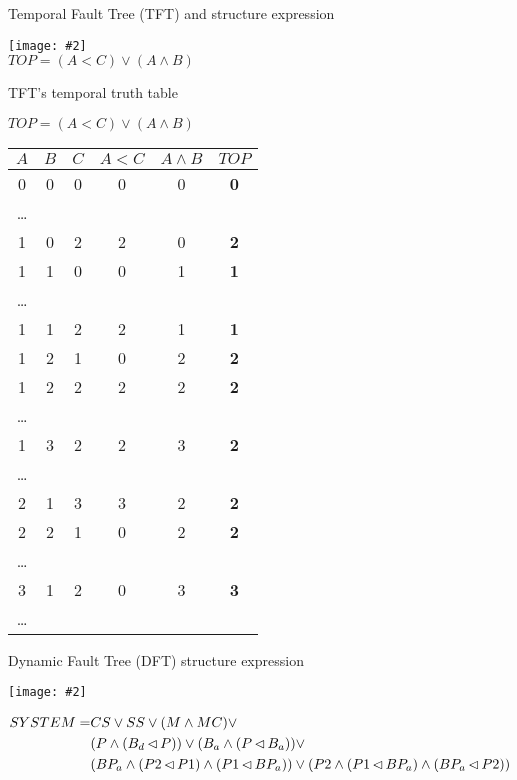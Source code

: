 \documentclass{beamer}
\def\TFT{%
	Temporal Fault Tree (TFT)%
	\gdef\TFT{TFT\xspace}%
	\gdef\TFTs{TFTs\xspace}%
	\xspace%
}
\def\TFTs{%
	Temporal Fault Trees (TFTs)%
	\gdef\TFT{TFT\xspace}%
	\gdef\TFTs{TFTs\xspace}%
	\xspace%
}
\def\DFT{%
	Dynamic Fault Tree (DFT)%
	\gdef\DFT{DFT\xspace}%
	\gdef\DFTs{DFTs\xspace}%
	\xspace%
}
\def\DFTs{%
	Dynamic Fault Trees (DFTs)%
	\gdef\DFT{DFT\xspace}%
	\gdef\DFTs{DFTs\xspace}%
	\xspace%
}
\newcommand{\includegraphicsaspectratio}[2][1]{%
  \texttt{[image: \#2]}%
}
\def\nibefore{\ensuremath\operatorname{\lhd}}
\begin{document}
\begin{frame}{\TFT and structure expression}
	\begin{center}
		\includegraphicsaspectratio[0.55]{tft-small-example}\\
		$TOP = (A < C) \lor (A \land B)$
	\end{center}
\end{frame}

\begin{frame}{\TFT's temporal truth table}
	\begin{center}
	\scriptsize
		$TOP = (A < C) \lor (A \land B)$\\
		\begin{tabular}{cccccc}
			$A$ & $B$ & $C$ & $A < C$ & $A \land B$ & $TOP$\\
			\hline
			0 & 0 & 0 & 0 & 0 & \textbf{0}\\
			\ldots\\
			1 & 0 & 2 & 2 & 0 & \textbf{2}\\
			1 & 1 & 0 & 0 & 1 & \textbf{1}\\
			\ldots\\
			1 & 1 & 2 & 2 & 1 & \textbf{1}\\
			1 & 2 & 1 & 0 & 2 & \textbf{2}\\
			1 & 2 & 2 & 2 & 2 & \textbf{2}\\
			\ldots\\
			1 & 3 & 2 & 2 & 3 & \textbf{2}\\
			\ldots\\
			2 & 1 & 3 & 3 & 2 & \textbf{2}\\
			2 & 2 & 1 & 0 & 2 & \textbf{2}\\
			\ldots\\
			3 & 1 & 2 & 0 & 3 & \textbf{3}\\
			\ldots\\
			\hline
		\end{tabular}
	\end{center}
\end{frame}

\begin{frame}[fragile]{\DFT structure expression}
	\begin{center}
		\scriptsize
		\includegraphicsaspectratio[0.60]{dft-example-mrl2014}
		\begin{align*}
		SYSTEM =& CS \lor SS \lor (M \land MC) \lor \\
			&(P \land (B_d \nibefore P)) \lor (B_a \land (P \nibefore B_a)) \lor \\
			&(BP_a \land (P2 \nibefore P1) \land (P1 \nibefore BP_a)) \lor
			(P2 \land (P1 \nibefore BP_a) \land (BP_a \nibefore P2))
		\end{align*}
	\end{center}
\end{frame}
\end{document}
